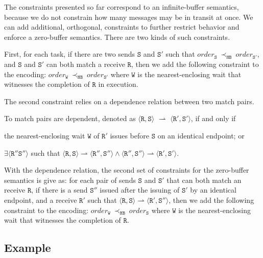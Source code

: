The constraints presented so far correspond to an infinite-buffer
semantics, because we do not constrain how many messages may be in
transit at once. We can add additional, orthogonal, constraints to
further restrict behavior and enforce a zero-buffer semantics. There are
two kinds of such constraints.

First, for each task, if there are two sends $\mathtt{S}$ and
$\mathtt{S'}$ such that
$\mathit{order}_\mathtt{S}\ \mathrm{\prec_\mathtt{HB}}\ \mathit{order}_\mathtt{S'}$,
and $\mathtt{S}$ and $\mathtt{S'}$ can both match a receive
$\mathtt{R}$, then we add the following constraint to the encoding:
$\mathit{order}_{\mathtt{W}}\ \mathrm{\prec_{\mathtt{HB}}}\ \mathit{order}_{\mathtt{S'}}$
where $\mathtt{W}$ is the nearest-enclosing wait that witnesses the
completion of $\mathtt{R}$ in execution.

The second constraint relies on a dependence relation between two match pairs.
\begin{definition}
To match pairs are dependent, denoted as $\langle\mathtt{R}, \mathtt{S}\rangle$ $\rightharpoonup$ $\langle\mathtt{R'}, \mathtt{S'}\rangle$, if and only if
\begin{compactenum}
\item the nearest-enclosing wait $\mathtt{W}$ of $\mathtt{R'}$ issues before $\mathtt{S}$ on an identical endpoint; or
\item $\exists\langle\mathtt{R''} \mathtt{S''}\rangle$ such that $\langle\mathtt{R}, \mathtt{S}\rangle \rightharpoonup \langle\mathtt{R''}, \mathtt{S''}\rangle\wedge\langle\mathtt{R''}, \mathtt{S''}\rangle \rightharpoonup \langle\mathtt{R'}, \mathtt{S'}\rangle$.
\end{compactenum}
\label{def:matchrelation}
\end{definition}
With the dependence relation, the second set of constraints for the zero-buffer semantics is give as: for each pair of sends $\mathtt{S}$ and $\mathtt{S'}$ that can both match an receive $\mathtt{R}$, if there is a send $\mathtt{S''}$ issued after the issuing of $\mathtt{S'}$ by an identical endpoint, and a receive $\mathtt{R'}$ such that $\langle\mathtt{R}, \mathtt{S}\rangle\rightharpoonup\langle\mathtt{R'}, \mathtt{S''}\rangle$, then we add the following constraint to the encoding: $\mathit{order}_{\mathtt{W}}\ \mathrm{\prec_{\mathtt{HB}}}\ \mathit{order}_{\mathtt{S}}$
where $\mathtt{W}$ is the nearest-enclosing wait that witnesses the
completion of $\mathtt{R}$.


\subsection{Example}

